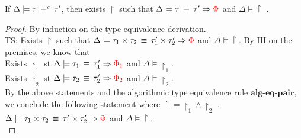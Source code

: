 \begin{thm}
 If $\Delta \models \tau \, \equiv^c \, \tau'$, then exists $\restriction$ such that $\Delta \models \tau \, \equiv \, \tau' \Rightarrow \textcolor{red} {\Phi}$ and  $\Delta \models \restriction $ .
\end{thm}
\begin{proof}
By induction on the type equivalence derivation.\\
  TS: Exists $\restriction$ such that $\Delta \models \tau_1 \times \tau_2   \, \equiv \, \tau_1' \times \tau_2'  \Rightarrow \textcolor{red} { \Phi}$ and $\Delta \models \restriction$.
By IH on the premises, we know that \\
Exists $\restriction_1 $ st  $\Delta \models \tau_1    \, \equiv \, \tau_1'  \Rightarrow \textcolor{red} { \Phi_1}$ and $\Delta \models \restriction_1$. \\
Exists $\restriction_2 $ st  $\Delta \models \tau_2  \, \equiv \, \tau_2'  \Rightarrow \textcolor{red} { \Phi_2}$ and $\Delta \models \restriction_2$. \\
By the above statements and the algorithmic type equivalence rule $\textbf{alg-eq-pair}$, we conclude the following statement where $\restriction = \restriction_1 \land \restriction_2 $ .\\
$\Delta \models \tau_1 \times \tau_2   \, \equiv \, \tau_1' \times \tau_2'  \Rightarrow \textcolor{red} { \Phi}$ and $\Delta \models \restriction$.\\
  

\end{proof}
